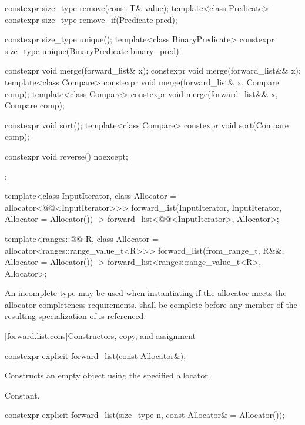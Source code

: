\begin{codeblock}
{{    constexpr size_type remove(const T& value);
    template<class Predicate> constexpr size_type remove_if(Predicate pred);

    constexpr size_type unique();
    template<class BinaryPredicate> constexpr size_type unique(BinaryPredicate binary_pred);

    constexpr void merge(forward_list& x);
    constexpr void merge(forward_list&& x);
    template<class Compare> constexpr void merge(forward_list& x, Compare comp);
    template<class Compare> constexpr void merge(forward_list&& x, Compare comp);

    constexpr void sort();
    template<class Compare> constexpr void sort(Compare comp);

    constexpr void reverse() noexcept;
  };

  template<class InputIterator, class Allocator = allocator<@@<InputIterator>>>
    forward_list(InputIterator, InputIterator, Allocator = Allocator())
      -> forward_list<@@<InputIterator>, Allocator>;

  template<ranges::@@ R, class Allocator = allocator<ranges::range_value_t<R>>>
    forward_list(from_range_t, R&&, Allocator = Allocator())
      -> forward_list<ranges::range_value_t<R>, Allocator>;
}
\end{codeblock}

\pnum
An incomplete type  may be used when instantiating 
if the allocator meets the
allocator completeness requirements.
 shall be complete before any member of the resulting specialization
of  is referenced.

[forward.list.cons]{Constructors, copy, and assignment}

%
\begin{itemdecl}
constexpr explicit forward_list(const Allocator&);
\end{itemdecl}

\begin{itemdescr}
\pnum
\effects
Constructs an empty  object using the specified allocator.

\pnum
\complexity
Constant.
\end{itemdescr}

%
\begin{itemdecl}
constexpr explicit forward_list(size_type n, const Allocator& = Allocator());
\end{itemdecl}

